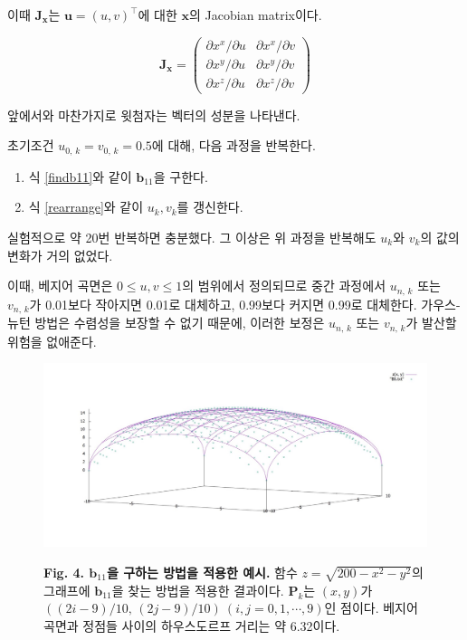 \documentclass{Humantech_Paper_Awardfullpaper_hutech}
\begin{document}
이때 $\mathbf{J}_\mathbf{x}$는 $\mathbf{u} = (u, v)^\intercal$에 대한 $\mathbf{x}$의 Jacobian matrix이다.

$$ \mathbf{J}_\mathbf{x} = \begin{pmatrix} \partial x^x / \partial u & \partial x^x / \partial v \\ \partial x^y / \partial u & \partial x^y / \partial v \\ \partial x^z / \partial u & \partial x^z / \partial v \end{pmatrix} $$ 

앞에서와 마찬가지로 윗첨자는 벡터의 성분을 나타낸다.

초기조건 $u_{0, \, k} = v_{0, \, k} = 0.5$에 대해, 다음 과정을 반복한다. 
\begin{enumerate}
	\item 식 \eqref{findb11}와 같이 $\mathbf{b}_{11}$을 구한다. 
	\item 식 \eqref{rearrange}와 같이 $u_k, v_k$를 갱신한다. 
\end{enumerate}
실험적으로 약 20번 반복하면 충분했다. 그 이상은 위 과정을 반복해도 $u_k$와 $v_k$의 값의 변화가 거의 없었다. 

이때, 베지어 곡면은 $0 \leq u, v \leq 1$의 범위에서 정의되므로 중간 과정에서 $u_{n, \, k}$ 또는 $v_{n, \, k}$가 0.01보다 작아지면 0.01로 대체하고, 0.99보다 커지면 0.99로 대체한다. 가우스-뉴턴 방법은 수렴성을 보장할 수 없기 때문에, 이러한 보정은 $u_{n, \, k}$ 또는 $v_{n, \, k}$가 발산할 위험을 없애준다. 

\begin{figure}[h]
	\begin{center}
		\includegraphics[width=.5\textwidth]{
		leastSquare}
	\end{center} 
	\raggedright \small \textbf{Fig. 4. $\mathbf{b}_{11}$을 구하는 방법을 적용한 예시.} 함수 $z = \sqrt{200 - x^2 - y^2}$의 그래프에 $\mathbf{b}_{11}$을 찾는 방법을 적용한 결과이다. $\mathbf{P}_k$는 $(x, y)$가 $((2i-9)/10, \, (2j-9)/10) \ (i, j = 0, 1, \cdots, 9)$인 점이다. 베지어 곡면과 정점들 사이의 하우스도르프 거리는 약 6.32이다. 
\end{figure}
\end{document}
